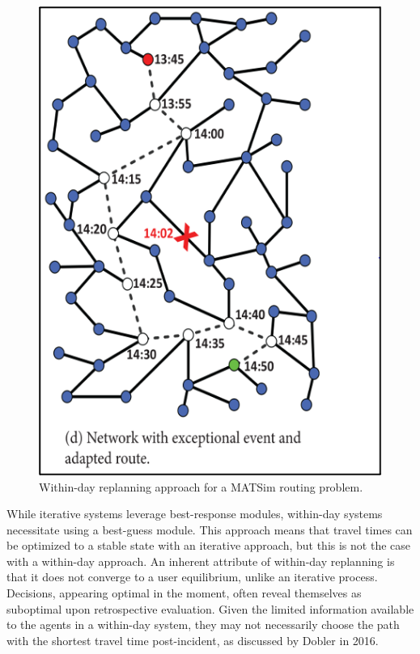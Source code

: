 \documentclass[fancy, oneside, mastersfancy, ms]{byuthesis}
\begin{document}
\begin{figure}

{\centering \includegraphics{figures/within_day.png}

}

\caption{Within-day replanning approach for a MATSim routing problem.}

\end{figure}

While iterative systems leverage best-response modules, within-day
systems necessitate using a best-guess module. This approach means that
travel times can be optimized to a stable state with an iterative
approach, but this is not the case with a within-day approach. An
inherent attribute of within-day replanning is that it does not converge
to a user equilibrium, unlike an iterative process. Decisions, appearing
optimal in the moment, often reveal themselves as suboptimal upon
retrospective evaluation. Given the limited information available to the
agents in a within-day system, they may not necessarily choose the path
with the shortest travel time post-incident, as discussed by Dobler in
2016.
\end{document}
